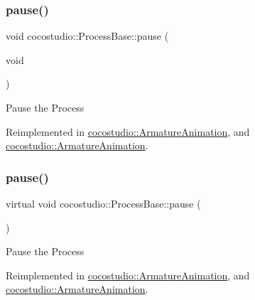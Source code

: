 \subsubsection{\texorpdfstring{pause()}{pause()}\hspace{0.1cm}{\footnotesize\ttfamily [1/2]}}
{\footnotesize\ttfamily void cocostudio\+::\+Process\+Base\+::pause (\begin{DoxyParamCaption}\item[{void}]{ }\end{DoxyParamCaption})\hspace{0.3cm}{\ttfamily [virtual]}}

Pause the Process 

Reimplemented in \hyperlink{classcocostudio_1_1ArmatureAnimation_a103b323b5c00970fbd09a9ee5ae6b76a}{cocostudio\+::\+Armature\+Animation}, and \hyperlink{classcocostudio_1_1ArmatureAnimation_acbaf743cc3c24ef753a94c15a6783926}{cocostudio\+::\+Armature\+Animation}.

\mbox{\label{classcocostudio_1_1ProcessBase_afdf802e606440dd57daab7d08ed620e1}} 
\subsubsection{\texorpdfstring{pause()}{pause()}\hspace{0.1cm}{\footnotesize\ttfamily [2/2]}}
{\footnotesize\ttfamily virtual void cocostudio\+::\+Process\+Base\+::pause (\begin{DoxyParamCaption}{ }\end{DoxyParamCaption})\hspace{0.3cm}{\ttfamily [virtual]}}

Pause the Process 

Reimplemented in \hyperlink{classcocostudio_1_1ArmatureAnimation_a103b323b5c00970fbd09a9ee5ae6b76a}{cocostudio\+::\+Armature\+Animation}, and \hyperlink{classcocostudio_1_1ArmatureAnimation_acbaf743cc3c24ef753a94c15a6783926}{cocostudio\+::\+Armature\+Animation}.

\mbox{\label{classcocostudio_1_1ProcessBase_a96ae031da46adb39e75e50ef8cbfa1a3}} 

